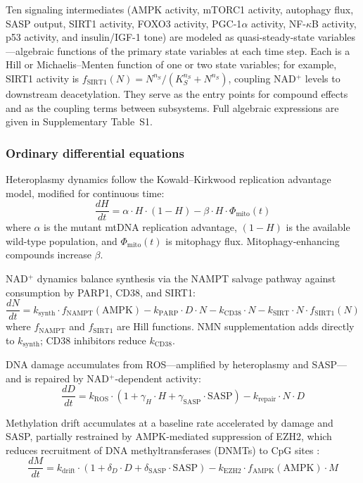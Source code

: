 \documentclass[11pt]{article}
\begin{document}
Ten signaling intermediates (AMPK activity, mTORC1 activity, autophagy flux, SASP output, SIRT1 activity, FOXO3 activity, PGC-1$\alpha$ activity, NF-$\kappa$B activity, p53 activity, and insulin/IGF-1 tone) are modeled as quasi-steady-state variables---algebraic functions of the primary state variables at each time step. Each is a Hill or Michaelis--Menten function of one or two state variables; for example, SIRT1 activity is $f_{\text{SIRT1}}(N) = N^{n_S} / (K_S^{n_S} + N^{n_S})$, coupling NAD$^+$ levels to downstream deacetylation. They serve as the entry points for compound effects and as the coupling terms between subsystems. Full algebraic expressions are given in Supplementary Table~S1.

\subsubsection{Ordinary differential equations}

Heteroplasmy dynamics follow the Kowald--Kirkwood replication advantage model, modified for continuous time:
\begin{equation}
\frac{dH}{dt} = \alpha \cdot H \cdot (1 - H) - \beta \cdot H \cdot \Phi_{\text{mito}}(t)
\end{equation}
where $\alpha$ is the mutant mtDNA replication advantage, $(1 - H)$ is the available wild-type population, and $\Phi_{\text{mito}}(t)$ is mitophagy flux. Mitophagy-enhancing compounds increase $\beta$.

NAD$^+$ dynamics balance synthesis via the NAMPT salvage pathway against consumption by PARP1, CD38, and SIRT1:
\begin{equation}
\frac{dN}{dt} = k_{\text{synth}} \cdot f_{\text{NAMPT}}(\text{AMPK}) - k_{\text{PARP}} \cdot D \cdot N - k_{\text{CD38}} \cdot N - k_{\text{SIRT}} \cdot N \cdot f_{\text{SIRT1}}(N)
\end{equation}
where $f_{\text{NAMPT}}$ and $f_{\text{SIRT1}}$ are Hill functions. NMN supplementation adds directly to $k_{\text{synth}}$; CD38 inhibitors reduce $k_{\text{CD38}}$.

DNA damage accumulates from ROS---amplified by heteroplasmy and SASP---and is repaired by NAD$^+$-dependent activity:
\begin{equation}
\frac{dD}{dt} = k_{\text{ROS}} \cdot (1 + \gamma_H \cdot H + \gamma_{\text{SASP}} \cdot \text{SASP}) - k_{\text{repair}} \cdot N \cdot D
\end{equation}

Methylation drift accumulates at a baseline rate accelerated by damage and SASP, partially restrained by AMPK-mediated suppression of EZH2, which reduces recruitment of DNA methyltransferases (DNMTs) to CpG sites \citep{Vire2006}:
\begin{equation}
\frac{dM}{dt} = k_{\text{drift}} \cdot (1 + \delta_D \cdot D + \delta_{\text{SASP}} \cdot \text{SASP}) - k_{\text{EZH2}} \cdot f_{\text{AMPK}}(\text{AMPK}) \cdot M
\end{equation}
\end{document}
